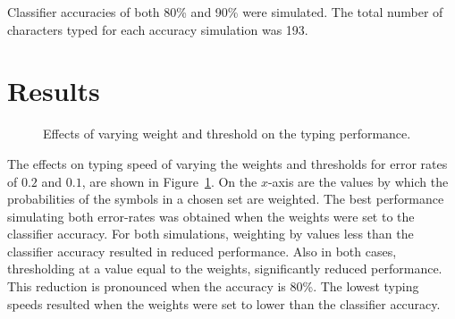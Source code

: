 \documentclass[12pt,titlepage]{article}
\begin{document}
Classifier accuracies of both 80\% and 90\% were simulated.  The total number of characters 
typed for each accuracy simulation was 193.

\section{Results}

\begin{figure}
\centering
{}
\caption{Effects of varying weight and threshold on the typing performance.}
\label{fig:WeightComp}
\end{figure}

The effects on typing speed of varying the weights and thresholds for error rates of $0.2$ and $0.1$, 
are shown in Figure~\ref{fig:WeightComp}.  On the $x$-axis are the values by which the probabilities of the symbols
in a chosen set are weighted.  The best performance simulating both error-rates was obtained 
when the weights were set to the classifier accuracy.  For both simulations, weighting by values 
less than the classifier accuracy resulted in  reduced performance.   Also in both cases, 
thresholding at a value equal to the weights, significantly reduced performance.  This reduction 
is pronounced when the accuracy is 80\%.   The lowest typing speeds resulted when the weights 
were set to lower than the classifier accuracy.
\end{document}

